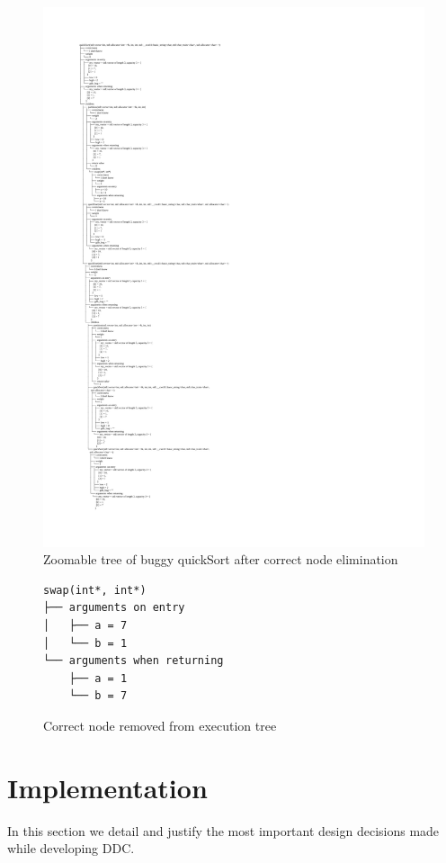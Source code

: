 \begin{figure}[p]
\centering
    \caption{Zoomable tree of buggy quickSort after correct node elimination}
    \label{fig:buggyTreeAfter}
\includegraphics[width=\textwidth,height=\textheight,keepaspectratio]{Imagenes/Vectorial/buggySwapRemoved.pdf}
\end{figure}

\begin{figure}[h]
    \centering
    \caption{Correct node removed from execution tree}
    \label{fig:removedNode}
    \begin{verbatim}
swap(int*, int*)
├── arguments on entry
│   ├── a = 7
│   └── b = 1
└── arguments when returning
    ├── a = 1
    └── b = 7
    \end{verbatim}
\end{figure}
\section{Implementation}
In this section we detail and justify the most important design decisions made while developing DDC.
